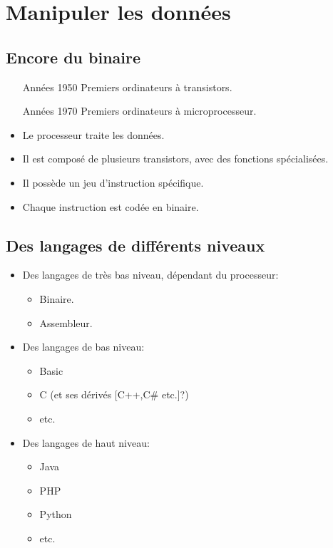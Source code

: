 \section[Manipuler]{Manipuler les données}
\subsection{Encore du binaire}

\begin{slide}
	\begin{itemize}
		\item[Années 1950] Premiers ordinateurs à transistors.
		\item[Années 1970] Premiers ordinateurs à microprocesseur. %
	\end{itemize}
\end{slide}

\begin{slide}
	\begin{itemize}
		\item Le processeur traite les données.
		\item Il est composé de plusieurs transistors, avec des fonctions spécialisées.
		\item Il possède un jeu d'instruction spécifique.
		\item Chaque instruction est codée en binaire.
	\end{itemize}
\end{slide}

\subsection{Des langages de différents niveaux}

\begin{slide}
	\begin{itemize}
		\item Des langages de très bas niveau, dépendant du processeur:
		\begin{itemize}
			\item Binaire.
			\item Assembleur.
		\end{itemize}
		\item Des langages de bas niveau:
		\begin{itemize}
			\item Basic
			\item C (et ses dérivés [C++,C\# etc.]?)
			\item etc.
		\end{itemize}
		\item Des langages de haut niveau:
		\begin{itemize}
			\item Java
			\item PHP
			\item Python
			\item etc.
		\end{itemize}
	\end{itemize}
\end{slide}

